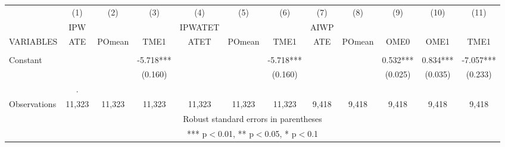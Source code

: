 \documentclass[]{article}
\begin{document}
\centering
\begin{tabular}{lccccccccccc} \hline
 & (1) & (2) & (3) & (4) & (5) & (6) & (7) & (8) & (9) & (10) & (11) \\
 & IPW &  &  & IPWATET &  &  & AIWP &  &  &  &  \\
VARIABLES & ATE & POmean & TME1 & ATET & POmean & TME1 & ATE & POmean & OME0 & OME1 & TME1 \\ \hline
 &  &  &  &  &  &  &  &  &  &  &  \\
Constant &  &  & -5.718*** &  &  & -5.718*** &  &  & 0.532*** & 0.834*** & -7.057*** \\
 &  &  & (0.160) &  &  & (0.160) &  &  & (0.025) & (0.035) & (0.233) \\
 & . &  &  &  &  &  &  &  &  &  &  \\
 Observations & 11,323 & 11,323 & 11,323 & 11,323 & 11,323 & 11,323 & 9,418 & 9,418 & 9,418 & 9,418 & 9,418 \\ \hline
\multicolumn{12}{c}{ Robust standard errors in parentheses} \\
\multicolumn{12}{c}{ *** p$<$0.01, ** p$<$0.05, * p$<$0.1} \\
\end{tabular}
\end{document}
